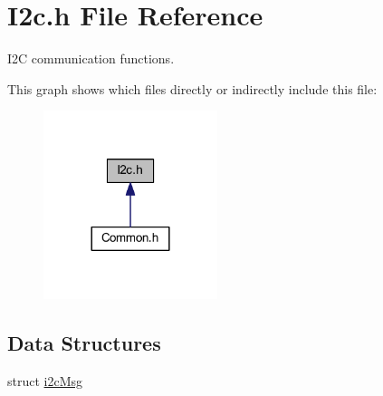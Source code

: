 \hypertarget{a00019}{\section{I2c.\-h File Reference}
\label{a00019}
}


I2\-C communication functions.  


This graph shows which files directly or indirectly include this file\-:
\nopagebreak
\begin{figure}[H]
\begin{center}
\leavevmode
\includegraphics[width=144pt]{a00049}
\end{center}
\end{figure}
\subsection*{Data Structures}
\begin{DoxyCompactItemize}
\item 
struct \hyperlink{a00004}{i2c\-Msg}
\end{DoxyCompactItemize}
